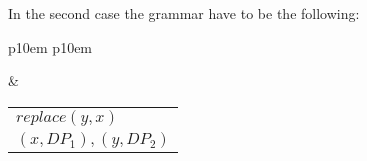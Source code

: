 In the second case the grammar have to be the following:
\medskip
\begin{center}
\begin{tabular}{ p{10em} p{10em} }
	\label{tbl:grammar.is}
	
	\begin{center}
		\begin{tikzpicture}
		\Tree [.S [.VP [.V is ] DP$_1\downarrow$ ] [.DP$_2\downarrow$ ] ]	
		\end{tikzpicture}
	\end{center}
	
	&

	\begin{center}
		\begin{tabular}{|c|l|}
			\hline
			\mbox{} & \mbox{}\\
			\hline
			\multicolumn{2}{|l|}{
				$replace(y,x)$
			} \\
			\hline
			\multicolumn{2}{|l|}{
				$(x,DP_{1}),(y,DP_{2})$
			} \\
			\hline
		\end{tabular}
	\end{center}	
	\\
\end{tabular}
\end{center}
\medskip